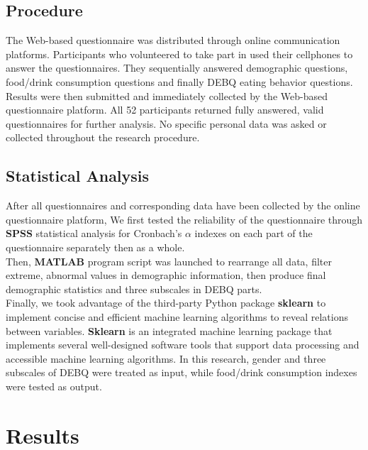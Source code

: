 \documentclass[letterpaper]{article}
\begin{document}
\subsection{Procedure}
The Web-based questionnaire was distributed through online communication platforms.
Participants who volunteered to take part in used their cellphones to answer the questionnaires.
They sequentially answered demographic questions, food/drink consumption questions and finally
DEBQ eating behavior questions. Results were then submitted and immediately collected by the Web-based questionnaire platform.
All 52 participants returned fully answered, valid questionnaires for further analysis. 
No specific personal data was asked or collected throughout the research procedure. 

\subsection{Statistical Analysis}
After all questionnaires and corresponding data have been collected by the online questionnaire platform,
We first tested the reliability of the questionnaire through \textbf{SPSS} statistical analysis for Cronbach's \(\alpha\) indexes
on each part of the questionnaire separately then as a whole. \\
\indent Then, \textbf{MATLAB} program script was launched to
rearrange all data, filter extreme, abnormal values in demographic information,
then produce final demographic statistics and three subscales in DEBQ parts. \\
\indent Finally, we took advantage of the third-party Python package \textbf{sklearn}\cite{scikit-learn} to implement
concise and efficient machine learning algorithms to reveal relations between variables.
\textbf{Sklearn} is an integrated machine learning package that implements several well-designed 
software tools that support data processing and accessible machine learning algorithms\cite{sklearn_api}.
In this research, gender and three subscales of DEBQ were treated as input, while food/drink 
consumption indexes were tested as output.

\section{Results}
\end{document}
